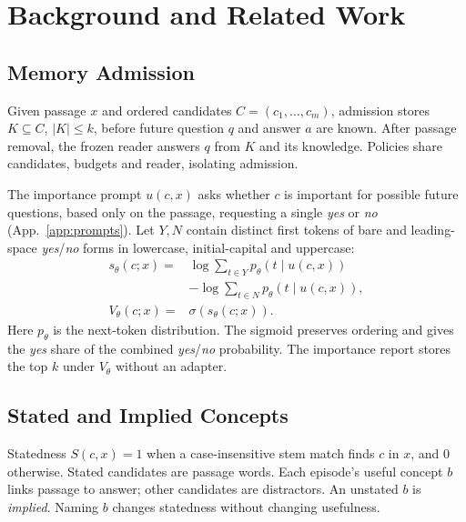 \section{Background and Related Work}\label{sec:related}

\subsection{Memory Admission}\label{sec:problem}

Given passage $x$ and ordered candidates $C=(c_1,\ldots,c_m)$, admission stores $K\subseteq C$, $|K|\leq k$, before future question $q$ and answer $a$ are known. After passage removal, the frozen reader answers $q$ from $K$ and its knowledge. Policies share candidates, budgets and reader, isolating admission.

The importance prompt $u(c,x)$ asks whether $c$ is important for possible future questions, based only on the passage, requesting a single \emph{yes} or \emph{no} (App.~\ref{app:prompts}). Let $Y,N$ contain distinct first tokens of bare and leading-space \emph{yes}/\emph{no} forms in lowercase, initial-capital and uppercase:
\begin{equation}
\begin{split}
s_\theta(c;x)={}&\log\!\sum_{t\in Y}p_\theta(t\mid u(c,x))\\
&-\log\!\sum_{t\in N}p_\theta(t\mid u(c,x)),\\
V_\theta(c;x)={}&\sigma\!\left(s_\theta(c;x)\right).
\end{split}
\label{eq:score}
\end{equation}
Here $p_\theta$ is the next-token distribution. The sigmoid preserves ordering and gives the \emph{yes} share of the combined \emph{yes}/\emph{no} probability. The importance report stores the top $k$ under $V_\theta$ without an adapter.

\subsection{Stated and Implied Concepts}\label{sec:statedness}

Statedness $S(c,x)=1$ when a case-insensitive stem match finds $c$ in $x$, and $0$ otherwise. Stated candidates are passage words. Each episode's useful concept $b$ links passage to answer; other candidates are distractors. An unstated $b$ is \emph{implied}. Naming $b$ changes statedness without changing usefulness.

